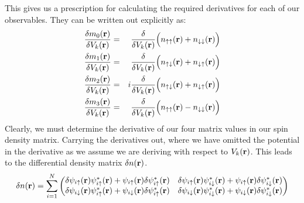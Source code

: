 \documentclass[10pt]{revtex4-1}
\newcommand{\bfr}{{\bf r}}
\newcommand{\ua}{\uparrow}
\newcommand{\da}{\downarrow}
\begin{document}
This gives us a prescription for calculating the required derivatives for each of our observables.
They can be written out explicitly as:
\begin{eqnarray}
  \nonumber
  \frac{\delta m_0(\bfr)}{\delta V_k(\bfr)} & = & \frac{\delta}{\delta V_k(\bfr)}\Big{(} n_{\ua \ua}(\bfr)+n_{\da \da}(\bfr) \Big{)} \\
  \nonumber
  \frac{\delta m_1(\bfr)}{\delta V_k(\bfr)} & = & \frac{\delta}{\delta V_k(\bfr)}\Big{(} n_{\ua \da}(\bfr)+n_{\da \ua}(\bfr) \Big{)} \\
  \nonumber
  \frac{\delta m_2(\bfr)}{\delta V_k(\bfr)} & = & i \frac{\delta}{\delta V_k(\bfr)}\Big{(} n_{\ua \da}(\bfr)+n_{\da \ua}(\bfr) \Big{)} \\
  \frac{\delta m_3(\bfr)}{\delta V_k(\bfr)} & = & \frac{\delta}{\delta V_k(\bfr)}\Big{(} n_{\ua \ua}(\bfr)-n_{\da \da}(\bfr) \Big{)}
\end{eqnarray}
Clearly, we must determine the derivative of our four matrix values in our spin density matrix.
Carrying the derivatives out, where we have omitted the potential in the derivative as we assume we are deriving with respect to $V_k(\bfr)$.
This leads to the differential density matrix $\delta n(\bfr)$.
\begin{equation}
  \delta n(\bfr) = \sum_{i=1}^N
  \begin{pmatrix}
    \delta \psi_{i \ua}(\bfr) \psi_{i \ua}^*(\bfr) + \psi_{i \ua}(\bfr) \delta \psi_{i \ua}^*(\bfr) &
    \delta \psi_{i \ua}(\bfr) \psi_{i \da}^*(\bfr) + \psi_{i \ua}(\bfr) \delta \psi_{i \da}^*(\bfr) \\
    \delta \psi_{i \da}(\bfr) \psi_{i \ua}^*(\bfr) + \psi_{i \da}(\bfr) \delta \psi_{i \ua}^*(\bfr) &
    \delta \psi_{i \da}(\bfr) \psi_{i \da}^*(\bfr) + \psi_{i \da}(\bfr) \delta \psi_{i \da}^*(\bfr)
  \end{pmatrix}
\end{equation}
\end{document}
